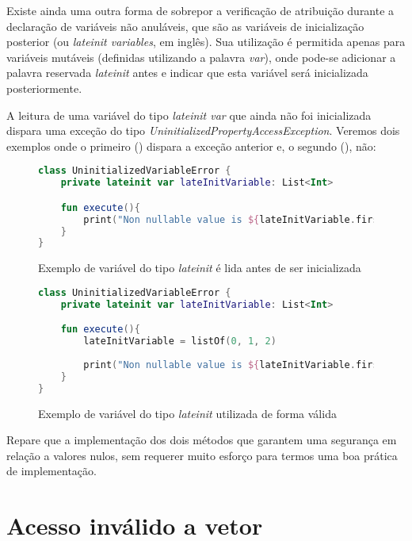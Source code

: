 Existe ainda uma outra forma de sobrepor a verificação de atribuição durante a declaração de variáveis não anuláveis, que são as variáveis de inicialização posterior (ou \textit{lateinit variables}, em inglês). Sua utilização é permitida apenas para variáveis mutáveis (definidas utilizando a palavra \textit{var}), onde pode-se adicionar a palavra reservada \textit{lateinit} antes e indicar que esta variável será inicializada posteriormente.

A leitura de uma variável do tipo \textit{lateinit var} que ainda não foi inicializada dispara uma exceção do tipo \textit{UninitializedPropertyAccessException}. Veremos dois exemplos onde o primeiro () dispara a exceção anterior e, o segundo (), não:

\begin{figure}[H]
    \centering
    \begin{lstlisting}[language=Kotlin]
class UninitializedVariableError {
    private lateinit var lateInitVariable: List<Int>

    fun execute(){
        print("Non nullable value is ${lateInitVariable.first()}")
    }
}
    \end{lstlisting}
    \caption{Exemplo de variável do tipo \textit{lateinit} é lida antes de ser inicializada}
    \label{fig:kotlin_uninitialized_lateinit_var}
\end{figure}

\begin{figure}[H]
    \centering
    \begin{lstlisting}[language=Kotlin]
class UninitializedVariableError {
    private lateinit var lateInitVariable: List<Int>

    fun execute(){
        lateInitVariable = listOf(0, 1, 2)
        
        print("Non nullable value is ${lateInitVariable.first()}")
    }
}
    \end{lstlisting}
    \caption{Exemplo de variável do tipo \textit{lateinit} utilizada de forma válida}
    \label{fig:kotlin_lateinit_variable_initialized}
\end{figure}

Repare que a implementação dos dois métodos que garantem uma segurança em relação a valores nulos, sem requerer muito esforço para termos uma boa prática de implementação.

\section{Acesso inválido a vetor}

